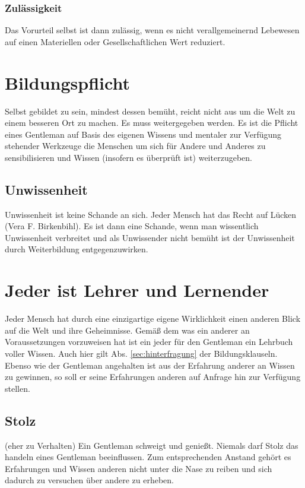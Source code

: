             \subsubsection{Zulässigkeit}
                Das Vorurteil selbst ist dann zulässig, wenn es nicht verallgemeinernd Lebewesen auf einen Materiellen oder Gesellschaftlichen Wert reduziert.

    \section{Bildungspflicht}
        Selbst gebildet zu sein, mindest dessen bemüht, reicht nicht aus um die Welt zu einem besseren Ort zu machen. 
        Es muss weitergegeben werden. 
        Es ist die Pflicht eines Gentleman auf Basis des eigenen Wissens und mentaler zur Verfügung stehender Werkzeuge die Menschen um sich für Andere und Anderes zu sensibilisieren und Wissen (insofern es überprüft ist) weiterzugeben.

        \subsection{Unwissenheit}
            Unwissenheit ist keine Schande an sich. \glqq Jeder Mensch hat das Recht auf Lücken\grqq \\  (Vera F. Birkenbihl). Es ist dann eine Schande, wenn man wissentlich Unwissenheit verbreitet und als Unwissender nicht bemüht ist der Unwissenheit durch Weiterbildung entgegenzuwirken.

    \section{Jeder ist Lehrer und Lernender}
        Jeder Mensch hat durch eine einzigartige eigene Wirklichkeit einen anderen Blick auf die Welt und ihre Geheimnisse. Gemäß dem was ein anderer an Voraussetzungen vorzuweisen hat ist ein jeder für den Gentleman ein Lehrbuch voller Wissen. Auch hier gilt Abs. \ref{sec:hinterfragung} der Bildungsklauseln. 
        Ebenso wie der Gentleman angehalten ist aus der Erfahrung anderer an Wissen zu gewinnen, so soll er seine Erfahrungen anderen auf Anfrage hin zur Verfügung stellen.

        \subsection{Stolz} {\color{red} (eher zu Verhalten)}
        Ein Gentleman schweigt und genießt. Niemals darf Stolz das handeln eines Gentleman beeinflussen. Zum entsprechenden Anstand gehört es Erfahrungen und Wissen anderen nicht unter die Nase zu reiben und sich dadurch zu versuchen über andere zu erheben.
